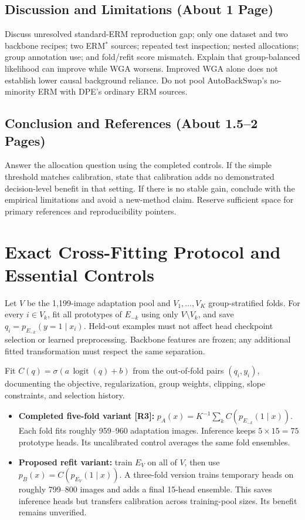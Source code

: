 \documentclass[runningheads]{llncs}
\newcommand{\status}[1]{\textbf{#1}}
\begin{document}
\subsection{Discussion and Limitations (About 1 Page)}
Discuss unresolved standard-ERM reproduction gap; only one dataset and two backbone recipes; two ERM$^*$ sources; repeated test inspection; nested allocations; group annotation use; and fold/refit score mismatch. Explain that group-balanced likelihood can improve while WGA worsens. Improved WGA alone does not establish lower causal background reliance. Do not pool AutoBackSwap's no-minority ERM with DPE's ordinary ERM sources.

\subsection{Conclusion and References (About 1.5--2 Pages)}
Answer the allocation question using the completed controls. If the simple threshold matches calibration, state that calibration adds no demonstrated decision-level benefit in that setting. If there is no stable gain, conclude with the empirical limitations and avoid a new-method claim. Reserve sufficient space for primary references and reproducibility pointers.


\section{Exact Cross-Fitting Protocol and Essential Controls}
\label{sec:protocol}
Let $V$ be the 1,199-image adaptation pool and $V_1,\ldots,V_K$ group-stratified folds. For every $i\in V_k$, fit all prototypes of $E_{-k}$ using only $V\setminus V_k$, and save $q_i=p_{E_{-k}}(y=1\mid x_i)$. Held-out examples must not affect head checkpoint selection or learned preprocessing. Backbone features are frozen; any additional fitted transformation must respect the same separation.

Fit $C(q)=\sigma(a\,\operatorname{logit}(q)+b)$ from the out-of-fold pairs $(q_i,y_i)$, documenting the objective, regularization, group weights, clipping, slope constraints, and selection history.
\begin{itemize}
\item \status{Completed five-fold variant [R3]:}
$p_A(x)=K^{-1}\sum_k C(p_{E_{-k}}(1\mid x))$. Each fold fits roughly 959--960 adaptation images. Inference keeps $5\times15=75$ prototype heads. Its uncalibrated control averages the same fold ensembles.
\item \status{Proposed refit variant:} train $E_V$ on all of $V$, then use $p_B(x)=C(p_{E_V}(1\mid x))$. A three-fold version trains temporary heads on roughly 799--800 images and adds a final 15-head ensemble. This saves inference heads but transfers calibration across training-pool sizes. Its benefit remains unverified.
\end{itemize}
\end{document}
